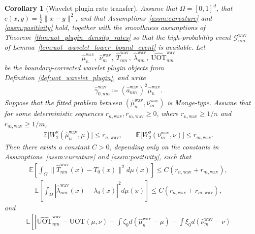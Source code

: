 \documentclass[11pt,reqno]{amsart}
\newtheorem{corollary}[theorem]{Corollary}
\theoremstyle{definition}
\renewcommand{\hat}{\widehat}
\newcommand{\Ep}{\mathbb{E}}
\begin{document}
\begin{corollary}[Wavelet plugin rate transfer]
\label{cor:uot_plugin_rate_transfer}
Assume that $\Omega=[0,1]^d$, that $c(x,y)=\tfrac{1}{2}\|x-y\|^2$, and that Assumptions~\ref{assm:curvature} and \ref{assm:positivity} hold, together with the smoothness assumptions of Theorem~\ref{thm:uot_plugin_density_rates} so that the high-probability event $\mathcal G_{nm}^{\mathrm{wav}}$ of Lemma~\ref{lem:uot_wavelet_lower_bound_event} is available.
Let
\[
    \hat\mu_n^{\mathrm{wav}},\ \hat\nu_m^{\mathrm{wav}},\ \hat T_{nm}^{\mathrm{wav}},\ \hat\lambda_{nm}^{\mathrm{wav}},\ \widehat{\mathrm{UOT}}_{nm}^{\mathrm{wav}}
\]
be the boundary-corrected wavelet plugin objects from Definition~\ref{def:uot_wavelet_plugin}, and write
\begin{align*}
    \hat\gamma_{0,nm}^{\mathrm{wav}}
    \coloneqq
    (\hat a_{nm}^{\mathrm{wav}})^2\hat\mu_n^{\mathrm{wav}}.
\end{align*}
Suppose that the fitted problem between $(\hat\mu_n^{\mathrm{wav}},\hat\nu_m^{\mathrm{wav}})$ is Monge-type.
Assume that for some deterministic sequences $r_{n,\mathrm{wav}},r_{m,\mathrm{wav}}\ge 0$, where $r_{n,\mathrm{wav}}\ge 1/n$ and $r_{m,\mathrm{wav}}\ge 1/m$,
\begin{align*}
    \Ep\bigl[W_2^2(\hat\mu_n^{\mathrm{wav}},\mu)\bigr] \le r_{n,\mathrm{wav}},
    \qquad
    \Ep\bigl[W_2^2(\hat\nu_m^{\mathrm{wav}},\nu)\bigr] \le r_{m,\mathrm{wav}}.
\end{align*}
Then there exists a constant $C>0$, depending only on the constants in Assumptions~\ref{assm:curvature} and \ref{assm:positivity}, such that
\begin{align}
\label{eq:uot_plugin_rate_transfer_map}
    \Ep\left[
        \int_{\Omega}
        \|\hat T_{nm}^{\mathrm{wav}}(x)-T_0(x)\|^2 d\mu(x)
    \right]
    \le
    C(r_{n,\mathrm{wav}}+r_{m,\mathrm{wav}}),
\end{align}
\begin{align}
\label{eq:uot_plugin_rate_transfer_lambda}
    \Ep\left[
        \int_{\Omega}
        |\hat\lambda_{nm}^{\mathrm{wav}}(x)-\lambda_0(x)|^2 d\mu(x)
    \right]
    \le
    C(r_{n,\mathrm{wav}}+r_{m,\mathrm{wav}}),
\end{align}
and
\begin{align}
\label{eq:uot_plugin_rate_transfer_value}
    \Ep\left[
        \left|
        \widehat{\mathrm{UOT}}_{nm}^{\mathrm{wav}}
        - \mathrm{UOT}(\mu,\nu)
        - \int \zeta_0 d(\hat\mu_n^{\mathrm{wav}}-\mu)
        - \int \xi_0 d(\hat\nu_m^{\mathrm{wav}}-\nu)

\end{align}
\end{corollary}
\end{document}
